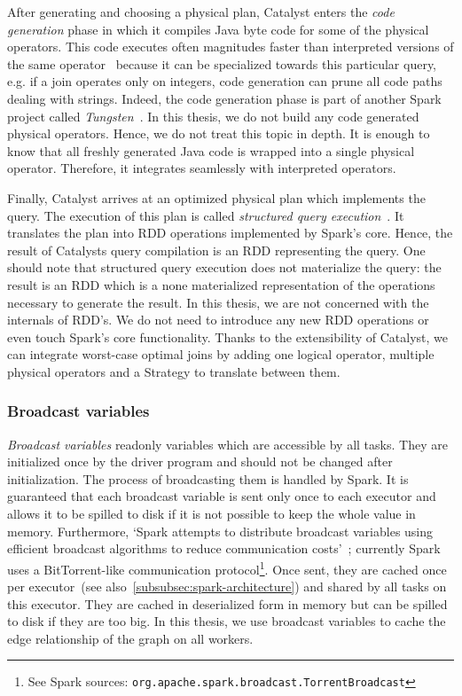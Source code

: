 After generating and choosing a physical plan, Catalyst enters the \textit{code generation} phase in which it compiles Java byte code for
some of the physical operators.
This code executes often magnitudes faster than interpreted versions of the same operator~\cite{spark-sql} because
it can be specialized towards this particular query, e.g. if a join operates only on integers, code
generation can prune all code paths dealing with strings.
Indeed, the code generation phase is part of another Spark project called
\textit{Tungsten}~\cite{tungsten-project,tungsten-code-generation}.
In this thesis, we do not build any code generated physical operators.
Hence, we do not treat this topic in depth.
It is enough to know that all freshly generated Java code is wrapped into a single physical operator.
Therefore, it integrates seamlessly with interpreted operators.

Finally, Catalyst arrives at an optimized physical plan which implements the query.
The execution of this plan is called
\textit{structured query execution}~\cite{spark-internals-structured-query-execution}.
It translates the plan into RDD operations implemented by Spark's core.
Hence, the result of Catalysts query compilation is an RDD representing the query.
One should note that structured query execution does not materialize the query: the result is an RDD which is a none
materialized representation of the operations necessary to generate the result.
In this thesis, we are not concerned with the internals of RDD's.
We do not need to introduce any new RDD operations or even touch Spark's core functionality.
Thanks to the extensibility of Catalyst, we can integrate worst-case optimal joins by adding one logical operator, multiple
physical operators and a Strategy to translate between them.

\subsubsection{Broadcast variables} \label{subsubsec:broadcast-variables}
\textit{Broadcast variables} readonly variables which are accessible by all tasks.
They are initialized once by the driver program and should not be changed after initialization.
The process of broadcasting them is handled by Spark.
It is guaranteed that each broadcast variable is sent only once to each executor and allows it to be spilled to disk if it is not
possible to keep the whole value in memory.
Furthermore, `Spark attempts to distribute broadcast variables using efficient broadcast algorithms to reduce communication
costs'~\cite{rdd-programming-guide}; currently Spark uses a BitTorrent-like communication protocol\footnote{See Spark sources:
\texttt{org.apache.spark.broadcast.TorrentBroadcast}}.
Once sent, they are cached once per executor~(see also~\cref{subsubsec:spark-architecture}) and shared by all tasks on this executor.
They are cached in deserialized form in memory but can be spilled to disk if they are too big.
In this thesis, we use broadcast variables to cache the edge relationship of the graph on all workers.

